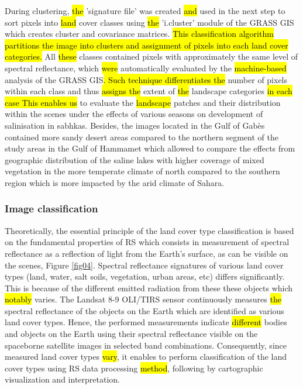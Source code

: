 \documentclass[land,article,submit,pdftex,moreauthors]{Definitions/mdpi}
\begin{document}
During clustering, \hl{the} 'signature file' was created \hl{and} used in the next step to sort pixels into \hl{land} cover classes using \hl{the }'i.cluster' module of the GRASS GIS which creates cluster and covariance matrices. \hl{This classification algorithm partitions the image into clusters and assignment of pixels into each land cover categories. }All \hl{these }classes contained pixels with approximately the same level of spectral reflectance, which \hl{were} automatically evaluated by the \hl{machine-based} analysis of the GRASS GIS\hl{. Such technique differentiates the} number of pixels within each class and thus \hl{assigns the} extent of \hl{the }landscape categories \hl{in each case This enables us} to evaluate the \hl{landscape }patches and their distribution within the scenes under the effects of various seasons on development of salinisation in sabhkas. Besides, the images located in the Gulf of Gabès contained more sandy desert areas compared to the northern segment of the study areas in the Gulf of Hammamet which allowed to compare the effects from geographic distribution of the saline lakes with higher coverage of mixed vegetation in the more temperate climate of north compared to the southern region which is more impacted by the arid climate of Sahara.

\subsubsection{Image classification}

Theoretically, the essential  principle of the land cover type classification is based on the fundamental properties of RS which consists in measurement of spectral reflectance as a reflection of light from the Earth's surface, as can be visible on the scenes, Figure \ref{fig04}. Spectral reflectance signatures of various land cover types (land, water, salt soils, vegetation, urban areas, etc) differs significantly. This is because of the different emitted radiation from these these objects which \hl{notably} varies. The Landsat 8-9 OLI/TIRS sensor continuously measures \hl{the }spectral reflectance of the objects on the Earth which are identified as various land cover types. Hence, the performed measurements indicate \hl{different} bodies and objects on the Earth using their spectral reflectance visible on the spaceborne satellite images in selected band combinations. Consequently, since measured land cover types \hl{vary}, it enables to perform classification of the land cover types using RS data processing \hl{method}, following by cartographic visualization and interpretation. 
\end{document}
